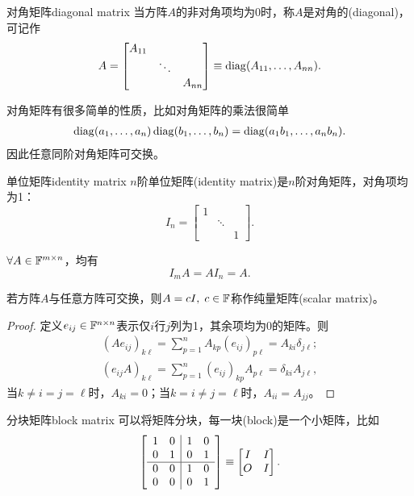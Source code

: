 \begin{definition}
	{对角矩阵}{diagonal matrix}
	当方阵$A$的非对角项均为0时，称$A$是对角的(diagonal)，可记作
	\begin{equation}
		A=\begin{bmatrix}
			A_{11}\\ &\ddots\\ &&A_{nn}
		\end{bmatrix}\equiv\operatorname{diag}(A_{11},\ldots,A_{nn}).
	\end{equation}
\end{definition}

\begin{remark}
	对角矩阵有很多简单的性质，比如对角矩阵的乘法很简单
	\begin{align}
		\operatorname{diag}(a_1,\ldots,a_n)\operatorname{diag}(b_1,\ldots,b_n)=\operatorname{diag}(a_1b_1,\ldots,a_nb_n).
	\end{align}
	因此任意同阶对角矩阵可交换。
\end{remark}

\begin{definition}{单位矩阵}{identity matrix}
	$n$阶单位矩阵(identity matrix)是$n$阶对角矩阵，对角项均为1：
	\[
		I_n=\begin{bmatrix}
		1&\\ &\ddots\\&&1
		\end{bmatrix}.
	\]
\end{definition}

\begin{corollary}
	$\forall A\in\mathbb F^{m\times n}$，均有
	\[
		I_mA=AI_n=A.
	\]
\end{corollary}

\begin{theorem}{}{}
	若方阵$A$与任意方阵可交换，则$A=cI,\;c\in\mathbb F$称作纯量矩阵(scalar matrix)。
\end{theorem}
\begin{proof}
	定义$e_{ij}\in\mathbb F^{n\times n}$表示仅$i$行$j$列为1，其余项均为0的矩阵。则
	\begin{align*}
		(Ae_{ij})_{k\ell}=\sum_{p=1}^nA_{kp}(e_{ij})_{p\ell}=A_{ki}\delta_{j\ell};\\
		(e_{ij}A)_{k\ell}=\sum_{p=1}^n(e_{ij})_{kp}A_{p\ell}=\delta_{ki}A_{j\ell},
	\end{align*}
	当$k\neq i=j=\ell$时，$A_{ki}=0$；当$k=i\neq j=\ell$时，$A_{ii}=A_{jj}$。
\end{proof}
\begin{definition}{分块矩阵}{block matrix}
	可以将矩阵分块，每一块(block)是一个小矩阵，比如
	\begin{align*}
		\left[\begin{array}{cc|cc}
			1&0&1&0\\
			0&1&0&1\\
			\hline
			0&0&1&0\\
			0&0&0&1	
		\end{array}\right]\equiv\begin{bmatrix}
			I&I\\O&I
		\end{bmatrix}.
	\end{align*}
\end{definition}

